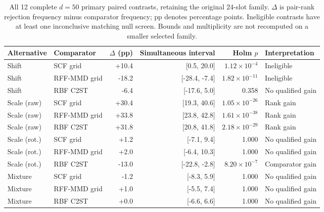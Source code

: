 {\color{blue}
\begin{table}[t]
\color{blue}
\centering
\scriptsize
\caption{All 12 complete $d=50$ primary paired contrasts, retaining the original 24-slot family. $\Delta$ is pair-rank rejection frequency minus comparator frequency; pp denotes percentage points. Ineligible contrasts have at least one inconclusive matching null screen. Bounds and multiplicity are not recomputed on a smaller selected family.}
\label{tab:comparator-paired}
\setlength{\tabcolsep}{8pt}
\renewcommand{\arraystretch}{1.2}
\begin{tabular}{llrrrl}
\toprule
Alternative & Comparator & $\Delta$ (pp) & Simultaneous interval & Holm $p$ & Interpretation\\
\midrule
Shift & SCF grid & +10.4 & [0.5, 20.0] & $1.12\times10^{-4}$ & Ineligible \\
Shift & RFF-MMD grid & -18.2 & [-28.4, -7.4] & $1.82\times10^{-11}$ & Ineligible \\
Shift & RBF C2ST & -6.4 & [-17.6, 5.0] & 0.358 & No qualified gain \\
Scale (raw) & SCF grid & +30.4 & [19.3, 40.6] & $1.05\times10^{-26}$ & Rank gain \\
Scale (raw) & RFF-MMD grid & +33.8 & [23.8, 42.8] & $1.61\times10^{-38}$ & Rank gain \\
Scale (raw) & RBF C2ST & +31.8 & [20.8, 41.8] & $2.18\times10^{-29}$ & Rank gain \\
Scale (rot.) & SCF grid & +1.2 & [-7.1, 9.4] & 1.000 & No qualified gain \\
Scale (rot.) & RFF-MMD grid & +2.0 & [-6.4, 10.3] & 1.000 & No qualified gain \\
Scale (rot.) & RBF C2ST & -13.0 & [-22.8, -2.8] & $8.20\times10^{-7}$ & Comparator gain \\
Mixture & SCF grid & -1.2 & [-8.3, 5.9] & 1.000 & No qualified gain \\
Mixture & RFF-MMD grid & +1.0 & [-5.5, 7.4] & 1.000 & No qualified gain \\
Mixture & RBF C2ST & +0.0 & [-6.6, 6.6] & 1.000 & No qualified gain \\
\bottomrule
\end{tabular}
\end{table}
}
